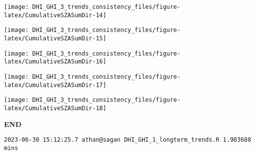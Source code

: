 \documentclass[
  10pt,
  a4paper,oneside]{article}
\begin{document}
\begin{center}\texttt{[image: DHI\_GHI\_3\_trends\_consistency\_files/figure-latex/CumulativeSZASumDir-14]} \end{center}

\begin{center}\texttt{[image: DHI\_GHI\_3\_trends\_consistency\_files/figure-latex/CumulativeSZASumDir-15]} \end{center}

\begin{center}\texttt{[image: DHI\_GHI\_3\_trends\_consistency\_files/figure-latex/CumulativeSZASumDir-16]} \end{center}

\begin{center}\texttt{[image: DHI\_GHI\_3\_trends\_consistency\_files/figure-latex/CumulativeSZASumDir-17]} \end{center}

\begin{center}\texttt{[image: DHI\_GHI\_3\_trends\_consistency\_files/figure-latex/CumulativeSZASumDir-18]} \end{center}

\textbf{END}

\begin{verbatim}
2023-06-30 15:12:25.7 athan@sagan DHI_GHI_1_longterm_trends.R 1.903688 mins
\end{verbatim}
\end{document}
